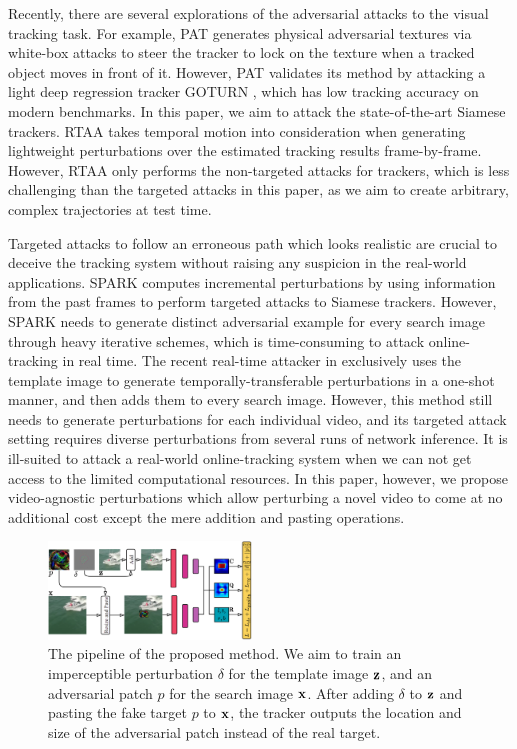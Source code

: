 \documentclass{article}
\begin{document}
Recently, there are several explorations of the adversarial attacks to the visual tracking task. For example, PAT \cite{PAT} generates physical adversarial textures via white-box attacks to steer the tracker to lock on the texture when a tracked object moves in front of it. However, PAT validates its method by attacking a light deep regression tracker GOTURN \cite{GOTURN}, which has low tracking accuracy on modern benchmarks. In this paper, we aim to attack the state-of-the-art Siamese trackers.
RTAA \cite{RTAA} takes temporal motion into consideration when generating lightweight perturbations over the estimated tracking results frame-by-frame. However, RTAA only performs the non-targeted attacks for trackers, which is less challenging than the targeted attacks in this paper, as we aim to create arbitrary, complex trajectories at test time. 

Targeted attacks to follow an erroneous path which looks realistic are crucial to deceive the tracking system without raising any suspicion in the real-world applications.
SPARK \cite{SPARK} computes incremental perturbations by using information from the past frames to perform targeted attacks to Siamese trackers. However, SPARK needs to generate distinct adversarial example for every search image through heavy iterative schemes, which is time-consuming to attack online-tracking in real time. The recent real-time attacker in \cite{TTP} exclusively uses the template image to generate temporally-transferable perturbations in a one-shot manner, and then adds them to every search image. However, this method still needs to generate perturbations for each individual video, and its targeted attack setting requires diverse perturbations from several runs of network inference. It is ill-suited to attack a real-world online-tracking system when we can not get access to the limited computational resources. In this paper, however, we propose video-agnostic perturbations which allow perturbing a novel video to come at no additional cost except the mere addition and pasting operations.

\begin{figure}[t]
\centering
\includegraphics[width=0.48\textwidth]{images/network_v4.png}
\caption{The pipeline of the proposed method. We aim to train an imperceptible perturbation $\delta$ for the template image $\textbf z$, and an adversarial patch $p$ for the search image $\textbf x$. After adding $\delta$ to $\textbf z$ and pasting the fake target $p$ to $\textbf x$, the tracker outputs the location and size of the adversarial patch instead of the real target.}
\label{fig:net}
\end{figure}
\end{document}
